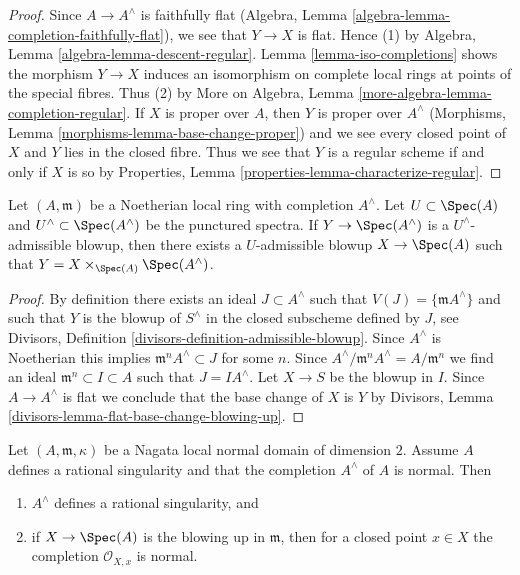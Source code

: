 \begin{proof}
Since $A \to A^\wedge$ is faithfully flat
(Algebra, Lemma \ref{algebra-lemma-completion-faithfully-flat}),
we see that $Y \to X$ is flat. Hence (1) by
Algebra, Lemma \ref{algebra-lemma-descent-regular}.
Lemma \ref{lemma-iso-completions} shows the morphism $Y \to X$
induces an isomorphism on complete local rings at points
of the special fibres. Thus (2) by
More on Algebra, Lemma \ref{more-algebra-lemma-completion-regular}.
If $X$ is proper over $A$, then $Y$ is proper over $A^\wedge$
(Morphisms, Lemma \ref{morphisms-lemma-base-change-proper})
and we see every closed point of $X$ and $Y$ lies in the closed fibre.
Thus we see that $Y$ is a regular scheme if and only if $X$ is so by
Properties, Lemma \ref{properties-lemma-characterize-regular}.
\end{proof}

\begin{lemma}
\label{lemma-descend-admissible-blowup}
Let $(A, \mathfrak m)$ be a Noetherian local ring with completion $A^\wedge$.
Let $U \subset \Spec(A)$ and $U^\wedge \subset \Spec(A^\wedge)$ be the
punctured spectra. If $Y \to \Spec(A^\wedge)$ is a $U^\wedge$-admissible
blowup, then there exists a $U$-admissible blowup $X \to \Spec(A)$
such that $Y = X \times_{\Spec(A)} \Spec(A^\wedge)$.
\end{lemma}

\begin{proof}
By definition there exists an ideal $J \subset A^\wedge$ such that
$V(J) = \{\mathfrak m A^\wedge\}$ and such that $Y$ is the blowup
of $S^\wedge$ in the closed subscheme defined by $J$, see
Divisors, Definition \ref{divisors-definition-admissible-blowup}.
Since $A^\wedge$ is Noetherian this implies
$\mathfrak m^n A^\wedge \subset J$ for some $n$.
Since $A^\wedge/\mathfrak m^n A^\wedge = A/\mathfrak m^n$
we find an ideal $\mathfrak m^n \subset I \subset A$
such that $J = I A^\wedge$. Let $X \to S$ be the blowup in $I$.
Since $A \to A^\wedge$ is flat
we conclude that the base change of $X$ is $Y$ by
Divisors, Lemma \ref{divisors-lemma-flat-base-change-blowing-up}.
\end{proof}

\begin{lemma}
\label{lemma-blowup-still-good}
Let $(A, \mathfrak m, \kappa)$ be a Nagata local normal domain of
dimension $2$. Assume $A$ defines a rational singularity and that
the completion $A^\wedge$ of $A$ is normal. Then
\begin{enumerate}
\item $A^\wedge$ defines a rational singularity, and
\item if $X \to \Spec(A)$ is the blowing up in $\mathfrak m$, then
for a closed point $x \in X$ the completion $\mathcal{O}_{X, x}$ is normal.
\end{enumerate}
\end{lemma}

